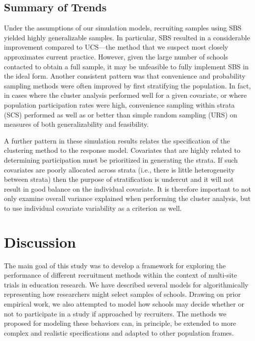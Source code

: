 \documentclass[
  english,
  man,floatsintext]{apa6}
\begin{document}
\hypertarget{summary-of-trends}{%
\subsection{Summary of Trends}\label{summary-of-trends}}

Under the assumptions of our simulation models, recruiting samples using SBS yielded highly generalizable samples. In particular, SBS resulted in a considerable improvement compared to UCS---the method that we suspect most closely approximates current practice. However, given the large number of schools contacted to obtain a full sample, it may be unfeasible to fully implement SBS in the ideal form. Another consistent pattern was that convenience and probability sampling methods were often improved by first stratifying the population. In fact, in cases where the cluster analysis performed well for a given covariate, or where population participation rates were high, convenience sampling within strata (SCS) performed as well as or better than simple random sampling (URS) on measures of both generalizability and feasibility.

A further pattern in these simulation results relates the specification of the clustering method to the response model. Covariates that are highly related to determining participation must be prioritized in generating the strata. If such covariates are poorly allocated across strata (i.e., there is little heterogeneity between strata) then the purpose of stratification is undercut and it will not result in good balance on the individual covariate. It is therefore important to not only examine overall variance explained when performing the cluster analysis, but to use individual covariate variability as a criterion as well. 

\hypertarget{discussion}{%
\section{Discussion}\label{discussion}}

The main goal of this study was to develop a framework for exploring the performance of different recruitment methods within the context of multi-site trials in education research. We have described several models for algorithmically representing how researchers might select samples of schools. Drawing on prior empirical work, we also attempted to model how schools may decide whether or not to participate in a study if approached by recruiters. The methods we proposed for modeling these behaviors can, in principle, be extended to more complex and realistic specifications and adapted to other population frames.
\end{document}
